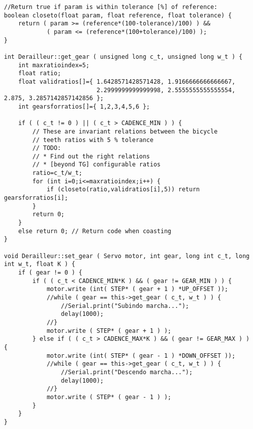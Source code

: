 \documentclass[a4paper,11pt]{article}
\begin{document}
\begin{lstlisting}
//Return true if param is within tolerance [%] of reference:
boolean closeto(float param, float reference, float tolerance) {
    return ( param >= (reference*(100-tolerance)/100) ) && 
            ( param <= (reference*(100+tolerance)/100) );
}

int Derailleur::get_gear ( unsigned long c_t, unsigned long w_t ) {
    int maxratioindex=5;
    float ratio;
    float validratios[]={ 1.6428571428571428, 1.9166666666666667, 
                          2.2999999999999998, 2.5555555555555554, 2.875, 3.2857142857142856 };
    int gearsforratios[]={ 1,2,3,4,5,6 };
    
    if ( ( c_t != 0 ) || ( c_t > CADENCE_MIN ) ) {
        // These are invariant relations between the bicycle
        // teeth ratios with 5 % tolerance
        // TODO:
        // * Find out the right relations
        // * [beyond TG] configurable ratios
        ratio=c_t/w_t;
        for (int i=0;i<=maxratioindex;i++) {
            if (closeto(ratio,validratios[i],5)) return gearsforratios[i];
        }
        return 0;
    }
    else return 0; // Return code when coasting
}

void Derailleur::set_gear ( Servo motor, int gear, long int c_t, long int w_t, float K ) {
    if ( gear != 0 ) {
        if ( ( c_t < CADENCE_MIN*K ) && ( gear != GEAR_MIN ) ) {
            motor.write (int( STEP* ( gear + 1 ) *UP_OFFSET ));
            //while ( gear == this->get_gear ( c_t, w_t ) ) {
                //Serial.print("Subindo marcha...");
                delay(1000);
            //}
            motor.write ( STEP* ( gear + 1 ) );
        } else if ( ( c_t > CADENCE_MAX*K ) && ( gear != GEAR_MAX ) ) {
            motor.write (int( STEP* ( gear - 1 ) *DOWN_OFFSET ));
            //while ( gear == this->get_gear ( c_t, w_t ) ) {
                //Serial.print("Descendo marcha...");
                delay(1000);
            //}
            motor.write ( STEP* ( gear - 1 ) );
        }
    }
}
\end{lstlisting}
\end{document}
